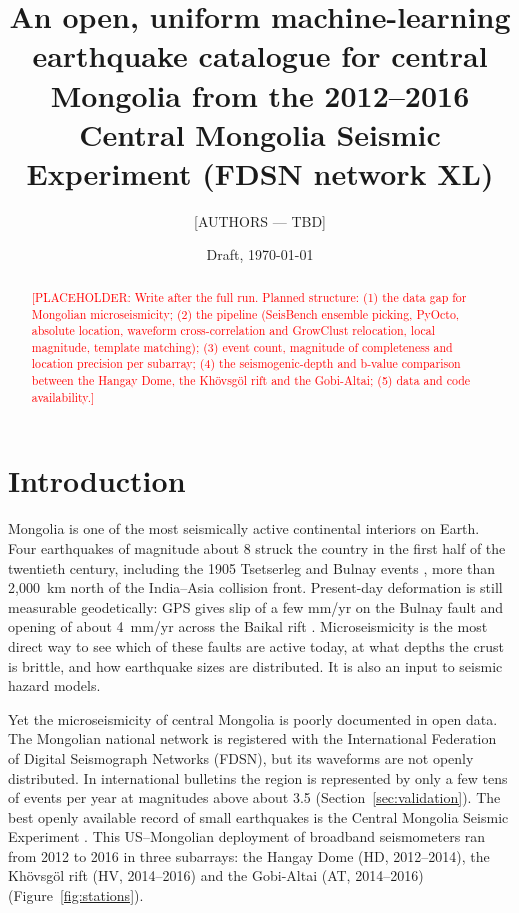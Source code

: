 \documentclass[11pt]{article}
\title{An open, uniform machine-learning earthquake catalogue for central Mongolia from the 2012--2016 Central Mongolia Seismic Experiment (FDSN network XL)}
\author{[AUTHORS --- TBD]}
\date{Draft, \today}
\newcommand{\placeholder}[1]{\textcolor{red}{[PLACEHOLDER: #1]}}
\begin{document}
\maketitle

\begin{abstract}
\placeholder{Write after the full run. Planned structure: (1) the data gap for Mongolian microseismicity; (2) the pipeline (SeisBench ensemble picking, PyOcto, absolute location, waveform cross-correlation and GrowClust relocation, local magnitude, template matching); (3) event count, magnitude of completeness and location precision per subarray; (4) the seismogenic-depth and b-value comparison between the Hangay Dome, the Khövsgöl rift and the Gobi-Altai; (5) data and code availability.}
\end{abstract}

\section{Introduction}

Mongolia is one of the most seismically active continental interiors on Earth. Four earthquakes of magnitude about 8 struck the country in the first half of the twentieth century, including the 1905 Tsetserleg and Bulnay events \citep{schlupp2007,choi2018}, more than 2,000~km north of the India--Asia collision front. Present-day deformation is still measurable geodetically: GPS gives slip of a few mm/yr on the Bulnay fault and opening of about 4~mm/yr across the Baikal rift \citep{calais2003}. Microseismicity is the most direct way to see which of these faults are active today, at what depths the crust is brittle, and how earthquake sizes are distributed. It is also an input to seismic hazard models.

Yet the microseismicity of central Mongolia is poorly documented in open data. The Mongolian national network is registered with the International Federation of Digital Seismograph Networks (FDSN), but its waveforms are not openly distributed. In international bulletins the region is represented by only a few tens of events per year at magnitudes above about 3.5 (Section~\ref{sec:validation}). The best openly available record of small earthquakes is the Central Mongolia Seismic Experiment \citep[FDSN code XL;][]{xl_dataset,meltzer2019}. This US--Mongolian deployment of broadband seismometers ran from 2012 to 2016 in three subarrays: the Hangay Dome (HD, 2012--2014), the Khövsgöl rift (HV, 2014--2016) and the Gobi-Altai (AT, 2014--2016) (Figure~\ref{fig:stations}).
\end{document}
